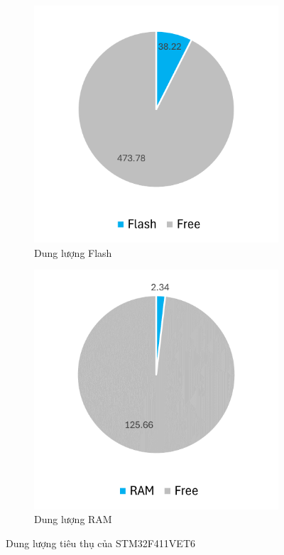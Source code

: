 \begin{figure}[H]
\centering
\begin{subfigure}[b]{0.45\textwidth} 
         \centering
         \includegraphics[width=\textwidth]{images/stm32flash.png}
         \caption{Dung lượng Flash}
\end{subfigure}
\hfill
\begin{subfigure}[b]{0.45\textwidth}
         \centering
         \includegraphics[width=\textwidth]{images/stm32ram.png}
         \caption{Dung lượng RAM}
\end{subfigure}
\caption{Dung lượng tiêu thụ của STM32F411VET6}
\label{fig:stm32mem}
\end{figure}

